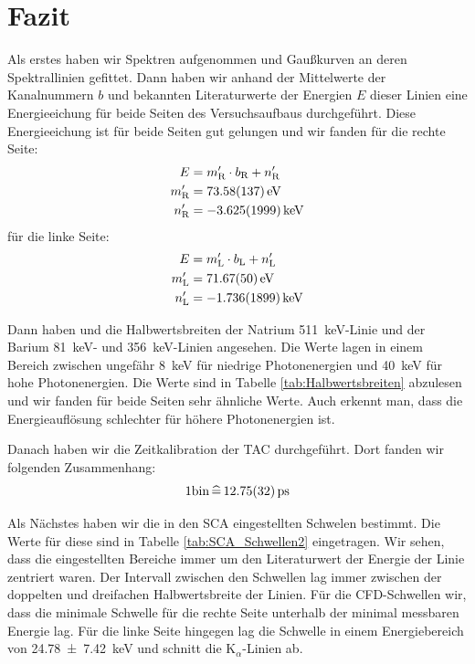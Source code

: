 \section{Fazit}

Als erstes haben wir Spektren aufgenommen und Gaußkurven an deren Spektrallinien gefittet.
Dann haben wir anhand der Mittelwerte der Kanalnummern $b$ und bekannten Literaturwerte der Energien $E$ dieser Linien eine Energieeichung für beide Seiten des Versuchsaufbaus durchgeführt.
Diese Energieeichung ist für beide Seiten gut gelungen und wir fanden für die rechte Seite:
\begin{align}
    \begin{split}
        E &= m_\text{R}' \cdot b_\text{R} + n_\text{R}' \\
        m_\text{R}' &= \SI{73,58 \pm 1,37}{\eV} \\
        n_\text{R}' &= \SI{-3,625 \pm 1,999}{\kilo\eV}
    \end{split}
    \label{eq:EnergieeichungR}
\end{align}
für die linke Seite:
\begin{align}
    \begin{split}
        E &= m_\text{L}' \cdot b_\text{L} + n_\text{L}' \\
        m_\text{L}' &= \SI{71,67 \pm 0,50}{\eV} \\
        n_\text{L}' &= \SI{-1,736 \pm 1,899}{\kilo\eV}
    \end{split}
    \label{eq:EnergieeichungL}
\end{align}

Dann haben und die Halbwertsbreiten der Natrium \SI{511}{\kilo\eV}-Linie und der Barium \SI{81}{\kilo\eV}- und \SI{356}{\kilo\eV}-Linien angesehen.
Die Werte lagen in einem Bereich zwischen ungefähr \SI{8}{\kilo\eV} für niedrige Photonenergien und \SI{40}{\kilo\eV} für hohe Photonenergien.
Die Werte sind in Tabelle \ref{tab:Halbwertsbreiten} abzulesen und wir fanden für beide Seiten sehr ähnliche Werte.
Auch erkennt man, dass die Energieauflösung schlechter für höhere Photonenergien ist.

Danach haben wir die Zeitkalibration der TAC durchgeführt.
Dort fanden wir folgenden Zusammenhang:
\begin{equation*}
    1 \text{bin} \, \widehat{=} \, \SI{12,75 \pm 0,32}{\pico\second}
    \label{eq:Zeitkalibration2}
\end{equation*}

Als Nächstes haben wir die in den SCA eingestellten Schwelen bestimmt.
Die Werte für diese sind in Tabelle \ref{tab:SCA_Schwellen2} eingetragen.
Wir sehen, dass die eingestellten Bereiche immer um den Literaturwert der Energie der Linie zentriert waren.
Der Intervall zwischen den Schwellen lag immer zwischen der doppelten und dreifachen Halbwertsbreite der Linien.
Für die CFD-Schwellen wir, dass die minimale Schwelle für die rechte Seite unterhalb der minimal messbaren Energie lag.
Für die linke Seite hingegen lag die Schwelle in einem Energiebereich von \SI{24,78 \pm 7,42}{\kilo\eV} und schnitt die K$_\alpha$-Linien ab.

